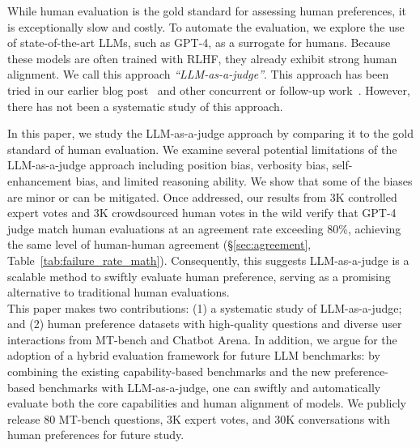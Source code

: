 While human evaluation is the gold standard for assessing human preferences, it is exceptionally slow and costly.
To automate the evaluation, we explore the use of state-of-the-art LLMs, such as GPT-4, as a surrogate for humans. 
Because these models are often trained with RLHF, they already exhibit strong human alignment.
We call this approach \emph{``LLM-as-a-judge''}. 
This approach has been tried in our earlier blog post~\cite{vicuna2023} and other concurrent or follow-up work~\cite{bubeck2023sparks, openaievals, dubois2023alpacafarm, dettmers2023qlora, zhou2023lima,gudibande2023false,peng2023instruction,wang2023large,chiang2023can,wang2023far}.
However, there has not been a systematic study of this approach. %


In this paper, we study the LLM-as-a-judge approach by comparing it to the gold standard of human evaluation. 
We examine several potential limitations of the LLM-as-a-judge approach including position bias, verbosity bias, self-enhancement bias, and limited reasoning ability.
We show that some of the biases are minor or can be mitigated. 
Once addressed, our results from 3K controlled expert votes and 3K crowdsourced human votes in the wild verify that GPT-4 judge match human evaluations at an agreement rate exceeding 80\%, achieving the same level of human-human agreement (\S\ref{sec:agreement}, Table~\ref{tab:failure_rate_math}).
Consequently, this suggests LLM-as-a-judge is a scalable method to swiftly evaluate human preference, serving as a promising alternative to traditional human evaluations.  \\

This paper makes two contributions: (1) a systematic study of LLM-as-a-judge; and (2) human preference datasets with high-quality questions and diverse user interactions from MT-bench and Chatbot Arena.
In addition, we argue for the adoption of a hybrid evaluation framework for future LLM benchmarks: by combining the existing capability-based benchmarks and the new preference-based benchmarks with LLM-as-a-judge, one can swiftly and automatically evaluate both the core capabilities and human alignment of models.
We publicly release 80 MT-bench questions, 3K expert votes, and 30K conversations with human preferences for future study.



























